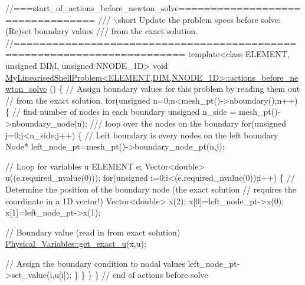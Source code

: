  
\begin{DoxyCodeInclude}
\textcolor{comment}{//===start\_of\_actions\_before\_newton\_solve=================================}
\textcolor{comment}{/// \(\backslash\)short Update the problem specs before solve: (Re)set boundary values}
\textcolor{comment}{}\textcolor{comment}{/// from the exact solution. }
\textcolor{comment}{}\textcolor{comment}{//========================================================================}
\textcolor{keyword}{template}<\textcolor{keyword}{class} ELEMENT, \textcolor{keywordtype}{unsigned} DIM, \textcolor{keywordtype}{unsigned} NNODE\_1D>
\textcolor{keywordtype}{void} \hyperlink{classMyLinearisedShellProblem_a81d050ee6958694b7645ea73cc8e4e9f}{MyLinearisedShellProblem<ELEMENT,DIM,NNODE\_1D>::actions\_before\_newton\_solve}
      ()
\{
 \textcolor{comment}{// Assign boundary values for this problem by reading them out}
 \textcolor{comment}{// from the exact solution.}
 \textcolor{keywordflow}{for}(\textcolor{keywordtype}{unsigned} n=0;n<mesh\_pt()->nboundary();n++)
  \{
   \textcolor{comment}{// find number of nodes in each boundary}
   \textcolor{keywordtype}{unsigned} n\_side = mesh\_pt()->nboundary\_node(n);\textcolor{comment}{}
\textcolor{comment}{   /// loop over the nodes on the boundary}
\textcolor{comment}{}   \textcolor{keywordflow}{for}(\textcolor{keywordtype}{unsigned} j=0;j<n\_side;j++)
    \{
     \textcolor{comment}{// Left boundary is every nodes on the left boundary }
     Node* left\_node\_pt=mesh\_pt()->boundary\_node\_pt(n,j);
   
     \textcolor{comment}{// Loop for variables u}
     ELEMENT e;
     Vector<double> u((e.required\_nvalue(0)));
     \textcolor{keywordflow}{for}(\textcolor{keywordtype}{unsigned} i=0;i<(e.required\_nvalue(0));i++)
      \{
       \textcolor{comment}{// Determine the position of the boundary node (the exact solution}
       \textcolor{comment}{// requires the coordinate in a 1D vector!)}
       Vector<double> x(2);
       x[0]=left\_node\_pt->x(0);
       x[1]=left\_node\_pt->x(1);
       
       \textcolor{comment}{// Boundary value (read in from exact solution)}
       \hyperlink{namespacePhysical__Variables_af90d0c580c57b1152fd1cc7046055031}{Physical\_Variables::get\_exact\_u}(x,u);
  
       \textcolor{comment}{// Assign the boundary condition to nodal values}
       left\_node\_pt->set\_value(i,u[i]);
      \}
    \}
  \} 
\} \textcolor{comment}{// end of actions before solve}

\end{DoxyCodeInclude}




